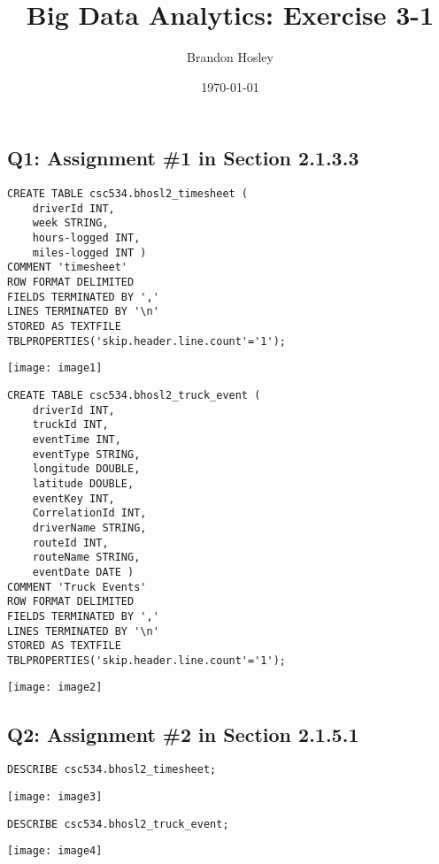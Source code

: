 \documentclass[]{article}
\title{Big Data Analytics: Exercise 3-1}
\author{Brandon Hosley}
\date{\today}
\begin{document}
\maketitle

\subsection*{Q1: Assignment \#1 in Section 2.1.3.3} 

\begin{verbatim}
CREATE TABLE csc534.bhosl2_timesheet ( 
	driverId INT, 
	week STRING, 
	hours-logged INT, 
	miles-logged INT ) 
COMMENT 'timesheet' 
ROW FORMAT DELIMITED 
FIELDS TERMINATED BY ',' 
LINES TERMINATED BY '\n' 
STORED AS TEXTFILE 
TBLPROPERTIES('skip.header.line.count'='1');
\end{verbatim}
\texttt{[image: image1]} %

\begin{verbatim}
CREATE TABLE csc534.bhosl2_truck_event ( 
	driverId INT,
	truckId INT,
	eventTime INT,
	eventType STRING,
	longitude DOUBLE, 
	latitude DOUBLE, 
	eventKey INT, 
	CorrelationId INT, 
	driverName STRING, 
	routeId INT, 
	routeName STRING, 
	eventDate DATE ) 
COMMENT 'Truck Events' 
ROW FORMAT DELIMITED 
FIELDS TERMINATED BY ',' 
LINES TERMINATED BY '\n' 
STORED AS TEXTFILE 
TBLPROPERTIES('skip.header.line.count'='1');
\end{verbatim}
\texttt{[image: image2]} %

\subsection*{Q2: Assignment \#2 in Section 2.1.5.1} 

\begin{verbatim}
DESCRIBE csc534.bhosl2_timesheet;
\end{verbatim}
\texttt{[image: image3]} %

\begin{verbatim}
DESCRIBE csc534.bhosl2_truck_event;
\end{verbatim}
\texttt{[image: image4]} %
\end{document}
